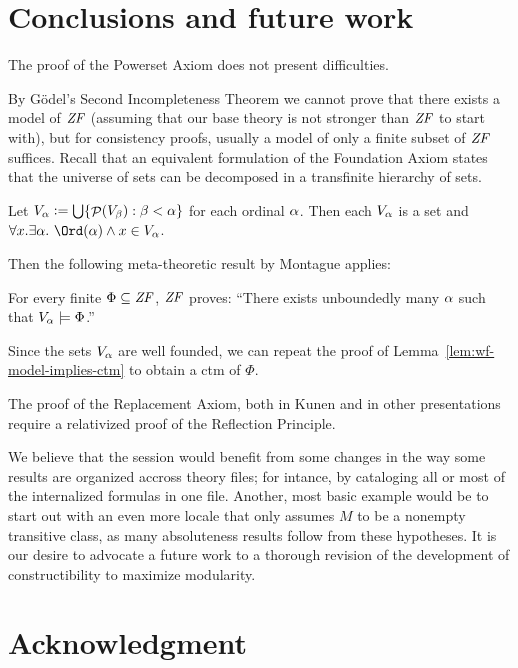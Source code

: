 \section{Conclusions and future work}
\label{sec:conclusions-future-work}

The proof of the Powerset Axiom does not present difficulties.

By G\"odel's Second Incompleteness Theorem we cannot  prove that
there exists a model of $\mathit{ZF}$  (assuming that our base theory is not
stronger than $\mathit{ZF}$ to start with), but for consistency proofs,
usually a model of only a finite subset of $\mathit{ZF}$ suffices. Recall that
an equivalent formulation of the Foundation Axiom states that the 
universe of sets can be decomposed in a transfinite hierarchy of
sets. 
\begin{theorem}
  Let $V_{\alpha}\mathrel{\mathop:}=\mathop{\textstyle\bigcup}\{\mathop{\mathcal{P}}(V_\beta) : \beta<\alpha\}$ for each ordinal
  $\alpha$. Then each $V_\alpha$ is a set and 
  $\forall x. \exists\al .\ \Ord(\al) \y x\in V_\al$.  
\end{theorem}
%
Then the following meta-theoretic result by Montague applies:
%
\begin{theorem}\label{th:reflection-principle}
  For every finite $\Phi\subseteq\mathit{ZF}$, $\mathit{ZF}$ proves: ``There exists
    unboundedly many $\alpha$ such that $V_\alpha\models \Phi$.''
\end{theorem}
%
Since the sets $V_\alpha$ are well founded, we can repeat the
proof of Lemma~\ref{lem:wf-model-implies-ctm} to obtain a ctm of
$\Phi$. 

The proof of the Replacement Axiom, both in Kunen and in
other presentations \cite{neeman-course} require a relativized proof
of the Reflection Principle. 

\medskip
{}

\medskip


We believe that the
 session  would benefit from some changes in
the way some results are organized accross theory files; for
intance, by cataloging all or most of the internalized formulas in one
file. Another, most basic example would be to start out with an even
more locale that only assumes $M$ to be a nonempty transitive class,
as many absoluteness results follow from these hypotheses.  
It is our desire to advocate a future work to a thorough
revision of the development of constructibility to maximize modularity.

\section*{Acknowledgment}


